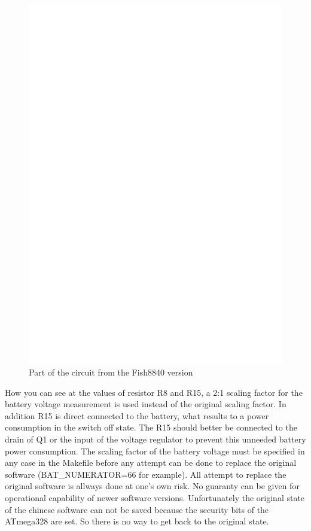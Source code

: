 \begin{figure}[H]
\centering
\includegraphics[width=12cm]{../FIG/Fish8840.eps}
\caption{Part of the circuit from the Fish8840 version}
\label{fig:Fish8840}
\end{figure}

How you can see at the values of resistor R8 and R15,
a 2:1 scaling factor for the battery voltage measurement is used instead of the original scaling factor.
In addition R15 is direct connected to the battery, what results to a power consumption in the switch off state.
The R15 should better be connected to the drain of Q1 or the input of the voltage regulator to prevent this
unneeded battery power consumption.
The scaling factor of the battery voltage must be specified in any case in the Makefile before any
attempt can be done to replace the original software (BAT\_NUMERATOR=66 for example).
All attempt to replace the original software is allways done at one's own risk.
No guaranty can be given for operational capability of newer software versions.
Unfortunately the original state of the chinese software can not be saved because the 
security bits of the ATmega328 are set. So there is no way to get back to the original state.

